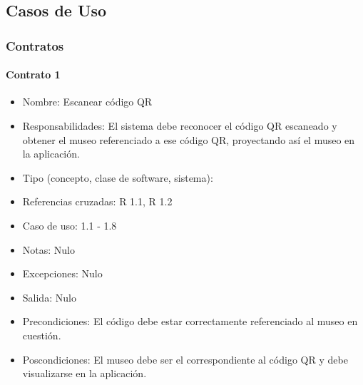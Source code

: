 \subsection{Casos de Uso}

\newpage


\newpage


\newpage


\newpage


\newpage


\newpage


\newpage


\newpage



\subsubsection{Contratos} %

\paragraph{Contrato 1} 
\begin{itemize}
\item Nombre: Escanear código QR
\item Responsabilidades: El sistema debe reconocer el código QR escaneado y obtener el museo referenciado a ese código QR, proyectando así el museo en la aplicación.
\item Tipo (concepto, clase de software, sistema): 
\item Referencias cruzadas: R 1.1, R 1.2
\item Caso de uso: 1.1 - 1.8
\item Notas: Nulo
\item Excepciones: Nulo
\item Salida: Nulo
\item Precondiciones: El código debe estar correctamente referenciado al museo en cuestión.
\item Poscondiciones: El museo debe ser el correspondiente al código QR y debe visualizarse en la aplicación.
\end{itemize}

